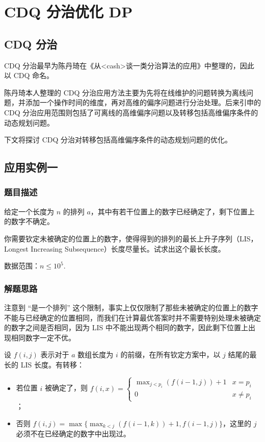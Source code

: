 \section{CDQ 分治优化 DP}

\subsection{CDQ 分治}

CDQ
分治最早为陈丹琦在《从\textless cash\textgreater 谈一类分治算法的应用》中整理的，因此以
CDQ 命名。

陈丹琦本人整理的 CDQ
分治应用方法主要为先将在线维护的问题转换为离线问题，并添加一个操作时间的维度，再对高维的偏序问题进行分治处理。后来引申的
CDQ
分治应用范围则包括了可离线的高维偏序问题以及转移包括高维偏序条件的动态规划问题。

下文将探讨 CDQ 分治对转移包括高维偏序条件的动态规划问题的优化。

\subsection{应用实例一}

\subsubsection{题目描述}

给定一个长度为 \(n\) 的排列
\(a\)，其中有若干位置上的数字已经确定了，剩下位置上的数字不确定。

你需要钦定未被确定的位置上的数字，使得得到的排列的最长上升子序列（LIS，Longest
Increasing Subsequence）长度尽量长。试求出这个最长长度。

数据范围：\(n\leq 10^5\).

\subsubsection{解题思路}

注意到 ``是一个排列''
这个限制，事实上仅仅限制了那些未被确定的位置上的数字不能与已经确定的位置相同，而我们在计算最优答案时并不需要特别处理未被确定的数字之间是否相同，因为
LIS 中不能出现两个相同的数字，因此剩下位置上出现相同数字一定不优。

设 \(f(i,j)\) 表示对于 \(a\) 数组长度为 \(i\)
的前缀，在所有钦定方案中，以 \(j\) 结尾的最长的 LIS 长度。有转移：

\begin{itemize}
\item
  若位置 \(i\) 被确定了，则
  \(f(i,x)=\begin{cases}\max_{j\lt p_i}(f(i-1,j))+1&x=p_i\\0&x\not=p_i\end{cases}\)；
\item
  否则 \(f(i,j)=\max\{\max_{k\lt j}(f(i-1,k))+1,f(i-1,j)\}\)，这里的
  \(j\) 必须不在已经确定的数字中出现过。
\end{itemize}

